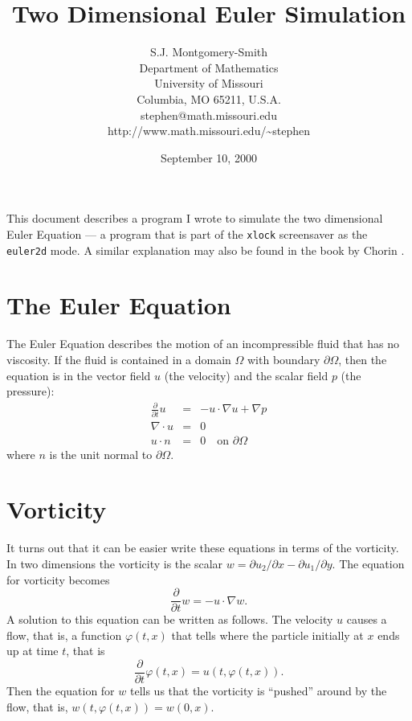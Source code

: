 \documentclass[12pt]{article}
\begin{document}
\title{Two Dimensional Euler Simulation}

\author{
S.J. Montgomery-Smith\\
Department of Mathematics\\
University of Missouri\\
Columbia, MO 65211, U.S.A.\\
stephen@math.missouri.edu\\
http://www.math.missouri.edu/\~{}stephen}

\date{September 10, 2000}

\maketitle

This document describes a program I wrote to simulate the 
two dimensional Euler Equation --- a program that is part
of the {\tt xlock} screensaver as the {\tt euler2d}
mode.  A similar explanation may also be found in the
book by Chorin \cite{C}.

\section{The Euler Equation}

The Euler Equation describes the motion of an incompressible
fluid that has no viscosity.  If the fluid is contained
in a domain $\Omega$ with boundary $\partial \Omega$, then
the equation is in the vector field $u$ (the velocity)
and the
scalar field $p$ (the pressure):
\begin{eqnarray*}
\frac{\partial}{\partial t} u &=& -u \cdot \nabla u + \nabla p \\
\nabla \cdot u &=& 0 \\
u \cdot n &=& 0 \quad \text{on $\partial \Omega$}
\end{eqnarray*}
where $n$ is the unit normal to $\partial \Omega$.

\section{Vorticity}

It turns out that it can be easier write these equations
in terms of the vorticity.  In two dimensions the vorticity
is the scalar $w = \partial u_2/\partial x - \partial u_1/\partial y$.
The equation for vorticity becomes
\[ \frac{\partial}{\partial t} w = -u \cdot \nabla w .\]
A solution to this equation can be written as follows.  The velocity
$u$ causes a flow, that is, a function $\varphi(t,x)$ that tells where
the particle initially at $x$ ends up at time $t$, that is
\[
\frac\partial{\partial t} \varphi(t,x)
= u(t,\varphi(t,x)) .\]
Then the equation
for $w$ tells us that the vorticity is ``pushed'' around by the flow,
that is, $w(t,\varphi(t,x)) = w(0,x)$.
\end{document}
